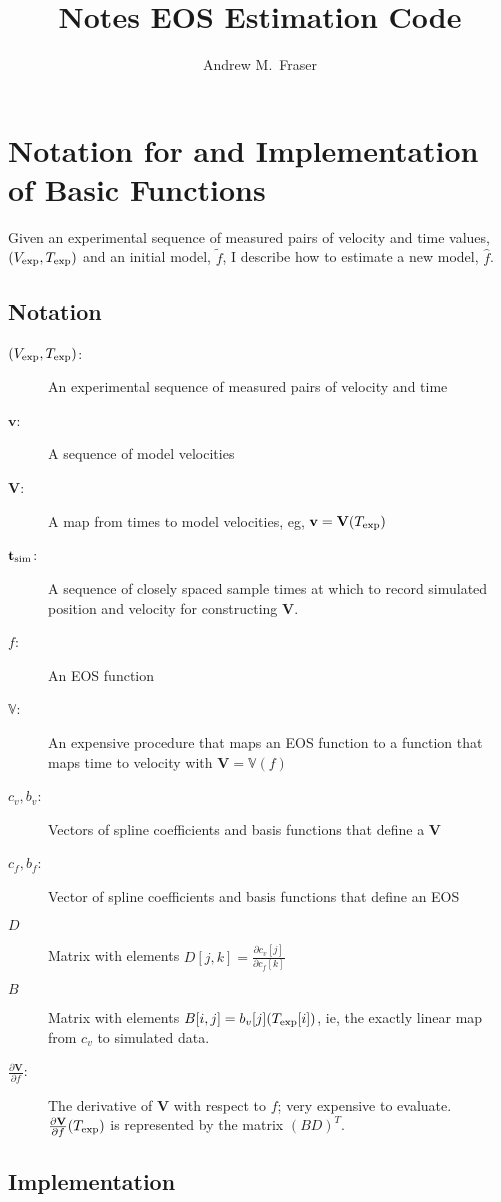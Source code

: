 \documentclass[12pt]{article}
\title{Notes EOS Estimation Code}
\author{Andrew M.\ Fraser}
\newcommand{\fnom}{\tilde f}
\newcommand{\fhat}{\hat f}
\newcommand{\partiald}[2]{\frac{\partial #1}{\partial #2}}
\newcommand\bv{\mathbf{v}}
\newcommand\Vfunc{\mathbb{V}}
\newcommand\Vt{\mathbf{V}}
\newcommand\vexp{V_{\rm{exp}}}
\newcommand\texp{T_{\rm{exp}}}
\newcommand\cf{c_f}
\newcommand\cv{c_v}
\newcommand\fbasis{b_f}
\newcommand\vbasis{b_v}
\newcommand\tsim{{\mathbf t}_{\rm{sim}}}
\newcommand\DVDf{\partiald{\Vt}{f}}
\begin{document}
\maketitle

\section{Notation for and Implementation of Basic Functions}
\label{sec:basic}


Given an experimental sequence of measured pairs of velocity and time
values, $(\vexp, \texp)$ and an initial model, $\fnom$, I describe how
to estimate a new model, $\fhat$.

\subsection{Notation}
\label{sec:basic_notation}

\begin{description}
\item[$(\vexp, \texp)$:] An experimental sequence of measured pairs of
  velocity and time
\item[$\bv$:] A sequence of model velocities
\item[$\Vt$:] A map from times to model velocities, eg, $\bv =
  \Vt(\texp)$
\item[$\tsim$:] A sequence of closely spaced sample times at which to record
  simulated position and velocity for constructing $\Vt$.
\item[$f$:] An EOS function
\item[$\Vfunc$:] An expensive procedure that maps an EOS function to a
  function that maps time to velocity with $\Vt = \Vfunc(f)$
\item[$\cv,\vbasis$:] Vectors of spline coefficients and basis functions
  that define a $\Vt$
\item[$\cf,\fbasis$:] Vector of spline coefficients and basis functions
  that define an EOS
\item[$D$] Matrix with elements $D[j,k] = \partiald{\cv[j]}{\cf[k]}$
\item[$B$] Matrix with elements $B[i,j] = \vbasis[j](\texp[i])$, ie,
  the exactly linear map from $c_v$ to simulated data.
\item[$\DVDf$:] The derivative of $\Vt$ with respect to $f$; very
  expensive to evaluate.  $\DVDf (\texp)$ is represented by the matrix
  $(BD)^T$.
\end{description}

\subsection{Implementation}
\label{sec:basic_implementation}
\end{document}
